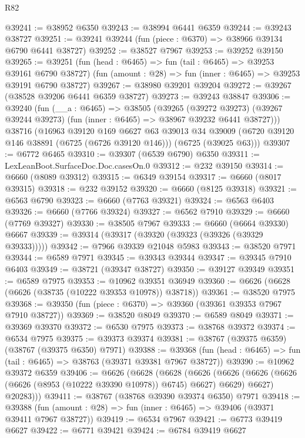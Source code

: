 \begin{lexlean}{R82}
\begin{coremodule}
@39241 := @38952 @6350
@39243 := @38994 @6441 @6359
@39244 := @39243 @38727
@39251 := @39241 @39244 (fun (piece : @6370) => @38966 @39134 @6790 @6441 @38727)
@39252 := @38527 @7967
@39253 := @39252 @39150
@39265 := @39251
    (fun (head : @6465) => fun (tail : @6465) => @39253 @39161 @6790 @38727)
    (fun (amount : @28) => fun (inner : @6465) => @39253 @39191 @6790 @38727)
@39267 := @38980 @39201 @39204
@39272 := @39267 (@38528 @39206 @6441 @6359 @38727)
@39273 := @39243 @38847
@39306 := @39240
    (fun (__a : @6465) =>
    @38505
      (@39265
        (@39272 @39273)
        (@39267 @39244 @39273)
        (fun (inner : @6465) => @38967 @39232 @6441 @38727)))
    @38716
    (@16963
      @39120
      @169
      @6627
      @63
      @39013
      @34
      @39009
      (@6720 @39120 @146 @38891 (@6725 (@6726 @39120 @146)))
      (@6725 (@39025 @63)))
@39307 := @6772 @6465
@39310 := @39307 (@6539 @6790) @6350
@39311 := LexLeanBoot.SurfaceDoc.Doc.casesOn.{0}
@39312 := @232 @39150
@39314 := @6660 (@8089 @39312)
@39315 := @6349 @39154
@39317 := @6660 (@8017 @39315)
@39318 := @232 @39152
@39320 := @6660 (@8125 @39318)
@39321 := @6563 @6790
@39323 := @6660 (@7763 @39321)
@39324 := @6563 @6403
@39326 := @6660 (@7766 @39324)
@39327 := @6562 @7910
@39329 := @6660 (@7769 @39327)
@39330 := @38505 @7967
@39333 := @6660 (@6664 @39330) @6667
@39339 := @39314 (@39317 (@39320 (@39323 (@39326 (@39329 @39333)))))
@39342 := @7966 @39339 @21048 @5983
@39343 := @38520 @7971
@39344 := @6589 @7971
@39345 := @39343 @39344
@39347 := @39345 @7910 @6403
@39349 := @38721 (@39347 @38727)
@39350 := @39127 @39349
@39351 := @6589 @7975
@39353 := @10962 @39351 @36949
@39360 := @6626 (@6628 (@6626 (@38735 (@10222 @39353 @10978)) @38718))
@39361 := @38520 @7975
@39368 := @39350 (fun (piece : @6370) => @39360 (@39361 @39353 @7967 @7910 @38727))
@39369 := @38520 @8049
@39370 := @6589 @8049
@39371 := @39369 @39370
@39372 := @6530 @7975
@39373 := @38768 @39372
@39374 := @6534 @7975
@39375 := @39373 @39374
@39381 := @38767 (@39375 @6359) (@38767 (@39375 @6350) @7971)
@39388 := @39368 (fun (head : @6465) => fun (tail : @6465) => @38763 (@39371 @39381 @7967 @38727))
@39390 := @10962 @39372 @6359
@39406 := @6626
    (@6628
      (@6628
        (@6626
          (@6626 (@6626 (@6626 (@6626 (@8953 (@10222 @39390 @10978)) @6745) @6627) @6629) @6627)
          @20283)))
@39411 := @38767 (@38768 @39390 @39374 @6350) @7971
@39418 := @39388 (fun (amount : @28) => fun (inner : @6465) => @39406 (@39371 @39411 @7967 @38727))
@39419 := @6534 @7967
@39421 := @6773 @39419 @6627
@39422 := @6771 @39421
@39424 := @6784 @39419 @6627

\end{coremodule}
\end{lexlean}
